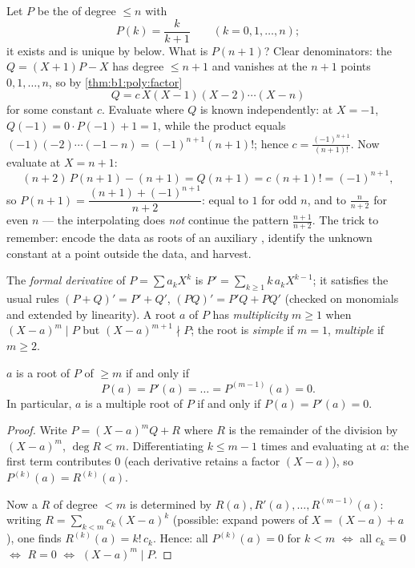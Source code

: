 \begin{example}\label{ex:b1:poly:auxiliary}
Let $P$ be the  of degree $\leq n$ with
\[
P(k) = \frac{k}{k+1} \qquad (k = 0, 1, \dots, n) ;
\]
it exists and is unique by  below. What is
$P(n+1)$? Clear denominators: the  $Q = (X+1)P - X$ has
degree $\leq n + 1$ and vanishes at the $n + 1$ points $0, 1,
\dots, n$, so by \cref{thm:b1:poly:factor}
\[
Q = c\,X(X-1)(X-2)\cdots(X-n)
\]
for some constant $c$. Evaluate where $Q$ is known independently:
at $X = -1$, $Q(-1) = 0 \cdot P(-1) + 1 = 1$, while the product
equals $(-1)(-2)\cdots(-1-n) = (-1)^{n+1}(n+1)!$; hence $c =
\frac{(-1)^{n+1}}{(n+1)!}$. Now evaluate at $X = n + 1$:
\[
(n+2)\,P(n+1) - (n+1) = Q(n+1) = c\,(n+1)! = (-1)^{n+1} ,
\]
so $P(n+1) = \dfrac{(n+1) + (-1)^{n+1}}{n+2}$: equal to $1$ for
odd $n$, and to $\frac{n}{n+2}$ for even $n$ --- the
interpolating  does \emph{not} continue the pattern
$\frac{n+1}{n+2}$. The trick to remember: encode the data as
roots of an auxiliary , identify the unknown constant
at a point outside the data, and harvest.
\end{example}

\begin{definition}\label{def:b1:poly:derivative}
The \emph{formal derivative} of $P = \sum a_k X^k$ is $P' = \sum_{k
\geq 1} k\,a_k X^{k-1}$; it satisfies the usual rules $(P+Q)' = P' +
Q'$, $(PQ)' = P'Q + PQ'$ (checked on monomials and extended by
linearity). A root $a$ of $P$ has
\emph{multiplicity} $m \geq 1$ when
$(X-a)^m \mid P$ but $(X-a)^{m+1} \nmid P$; the root is \emph{simple}
if $m = 1$, \emph{multiple} if $m \geq 2$.
\end{definition}

\begin{proposition}\label{prop:b1:poly:multiplicity}
$a$ is a root of $P$ of  $\geq m$ if and only if
\[
P(a) = P'(a) = \dots = P^{(m-1)}(a) = 0 .
\]
In particular, $a$ is a multiple root of $P$ if and only if $P(a) =
P'(a) = 0$.
\end{proposition}

\begin{proof}
Write $P = (X - a)^m Q + R$ where $R$ is the remainder of the division
by $(X-a)^m$, $\deg R < m$. Differentiating $k \leq m - 1$ times and
evaluating at $a$: the first term contributes $0$ (each derivative
retains a factor $(X-a)$), so $P^{(k)}(a) = R^{(k)}(a)$.

Now a  $R$ of degree $< m$ is determined by $R(a), R'(a),
\dots, R^{(m-1)}(a)$: writing $R = \sum_{k < m} c_k (X - a)^k$
(possible: expand powers of $X = (X - a) + a$), one finds
$R^{(k)}(a) = k!\, c_k$. Hence: all $P^{(k)}(a) = 0$ for $k < m$
$\iff$ all $c_k = 0$ $\iff$ $R = 0$ $\iff$ $(X-a)^m \mid P$.
\end{proof}

